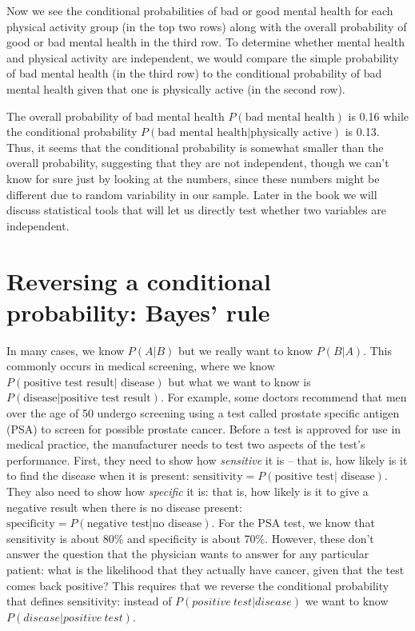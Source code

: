 \documentclass[12pt,]{book}
\theoremstyle{definition}
\theoremstyle{definition}
\theoremstyle{definition}
\theoremstyle{remark}
\begin{document}
Now we see the conditional probabilities of bad or good mental health for each physical activity group (in the top two rows) along with the overall probability of good or bad mental health in the third row. To determine whether mental health and physical activity are independent, we would compare the simple probability of bad mental health (in the third row) to the conditional probability of bad mental health given that one is physically active (in the second row).

The overall probability of bad mental health \(P(\text{bad mental health})\) is 0.16 while the conditional probability \(P(\text{bad mental health|physically active})\) is 0.13. Thus, it seems that the conditional probability is somewhat smaller than the overall probability, suggesting that they are not independent, though we can't know for sure just by looking at the numbers, since these numbers might be different due to random variability in our sample. Later in the book we will discuss statistical tools that will let us directly test whether two variables are independent.

\hypertarget{bayestheorem}{%
\section{Reversing a conditional probability: Bayes' rule}\label{bayestheorem}}

In many cases, we know \(P(A|B)\) but we really want to know \(P(B|A)\). This commonly occurs in medical screening, where we know \(P(\text{positive test result| disease})\) but what we want to know is \(P(\text{disease|positive test result})\). For example, some doctors recommend that men over the age of 50 undergo screening using a test called prostate specific antigen (PSA) to screen for possible prostate cancer. Before a test is approved for use in medical practice, the manufacturer needs to test two aspects of the test's performance. First, they need to show how \emph{sensitive} it is -- that is, how likely is it to find the disease when it is present: \(\text{sensitivity} = P(\text{positive test| disease})\). They also need to show how \emph{specific} it is: that is, how likely is it to give a negative result when there is no disease present: \(\text{specificity} = P(\text{negative test|no disease})\). For the PSA test, we know that sensitivity is about 80\% and specificity is about 70\%. However, these don't answer the question that the physician wants to answer for any particular patient: what is the likelihood that they actually have cancer, given that the test comes back positive? This requires that we reverse the conditional probability that defines sensitivity: instead of \(P(positive\ test| disease)\) we want to know \(P(disease|positive\ test)\).
\end{document}
